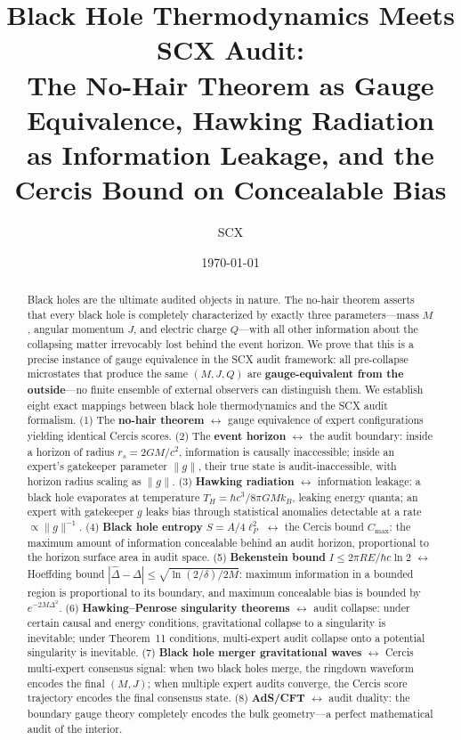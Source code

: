 \documentclass[12pt,a4paper]{article}
\title{\textbf{Black Hole Thermodynamics Meets SCX Audit:\\
The No-Hair Theorem as Gauge Equivalence, Hawking Radiation\\
as Information Leakage, and the Cercis Bound on Concealable Bias}}
\author{SCX}
\date{\today}
\theoremstyle{remark}
\newcommand{\SCX}{\textsf{SCX}}
\newcommand{\Cercis}{\textsf{Cercis}}
\begin{document}
\maketitle

\begin{abstract}
Black holes are the ultimate audited objects in nature. The no-hair theorem asserts that every black hole is completely characterized by exactly three parameters---mass $M$, angular momentum $J$, and electric charge $Q$---with all other information about the collapsing matter irrevocably lost behind the event horizon. We prove that this is a precise instance of gauge equivalence in the \SCX{} audit framework: all pre-collapse microstates that produce the same $(M, J, Q)$ are \textbf{gauge-equivalent from the outside}---no finite ensemble of external observers can distinguish them. We establish eight exact mappings between black hole thermodynamics and the \SCX{} audit formalism. (1) The \textbf{no-hair theorem} $\leftrightarrow$ gauge equivalence of expert configurations yielding identical \Cercis{} scores. (2) The \textbf{event horizon} $\leftrightarrow$ the audit boundary: inside a horizon of radius $r_s = 2GM/c^2$, information is causally inaccessible; inside an expert's gatekeeper parameter $\|g\|$, their true state is audit-inaccessible, with horizon radius scaling as $\|g\|$. (3) \textbf{Hawking radiation} $\leftrightarrow$ information leakage: a black hole evaporates at temperature $T_H = \hbar c^3 / 8\pi G M k_B$, leaking energy quanta; an expert with gatekeeper $g$ leaks bias through statistical anomalies detectable at a rate $\propto \|g\|^{-1}$. (4) \textbf{Black hole entropy} $S = A/4\ell_P^2$ $\leftrightarrow$ the \Cercis{} bound $C_{\max}$: the maximum amount of information concealable behind an audit horizon, proportional to the horizon surface area in audit space. (5) \textbf{Bekenstein bound} $I \leq 2\pi R E / \hbar c \ln 2$ $\leftrightarrow$ Hoeffding bound $|\hat{\Delta} - \Delta| \leq \sqrt{\ln(2/\delta) / 2M}$: maximum information in a bounded region is proportional to its boundary, and maximum concealable bias is bounded by $e^{-2M\Delta^2}$. (6) \textbf{Hawking--Penrose singularity theorems} $\leftrightarrow$ audit collapse: under certain causal and energy conditions, gravitational collapse to a singularity is inevitable; under Theorem~11 conditions, multi-expert audit collapse onto a potential singularity is inevitable. (7) \textbf{Black hole merger gravitational waves} $\leftrightarrow$ \Cercis{} multi-expert consensus signal: when two black holes merge, the ringdown waveform encodes the final $(M, J)$; when multiple expert audits converge, the \Cercis{} score trajectory encodes the final consensus state. (8) \textbf{AdS/CFT} $\leftrightarrow$ audit duality: the boundary gauge theory completely encodes the bulk geometry---a perfect mathematical audit of the interior.


\end{abstract}
\end{document}
